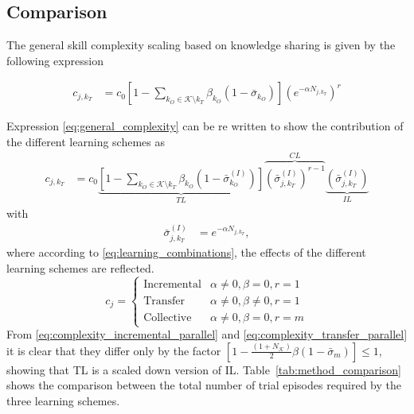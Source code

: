 \subsection{Comparison}
The general skill complexity scaling based on knowledge sharing is given by the following expression
\begin{tcolorbox}
	\begin{align}\label{eq:general_complexity}
		c_{j,k_T} &= c_0\left[1- \sum\limits_{k_O \in \mathcal{K} \setminus k_T}\beta_{k_O} \left( 1 - \bar{\sigma}_{k_O} \right)\right] \left(e^{-\alpha N_{j,k_T}} \right)^r
	\end{align}
\end{tcolorbox}
Expression \ref{eq:general_complexity} can be re written to show the contribution of the different learning schemes as
\begin{align}
	c_{j,k_T} &= c_0\underbrace{\left[1- \sum\limits_{k_O \in \mathcal{K} \setminus k_T}\beta_{k_O} \left( 1 - \bar{\sigma}^{(I)}_{k_O} \right)\right]}_{TL}\overbrace{ \left(\bar{\sigma}^{(I)}_{j,k_T} \right)^{r-1}}^{CL}\underbrace{ \left(\bar{\sigma}^{(I)}_{j,k_T} \right)}_{IL}
\end{align}
with
\begin{align}
    \bar{\sigma}^{(I)}_{j,k_T}&= e^{-\alpha N_{j,k_T}},
\end{align}
 where according to \eqref{eq:learning_combinations}, the effects of the different learning schemes are reflected.
 \begin{equation}
	 c_j =
	     \begin{cases} 
		       \text{Incremental} & \alpha\neq 0, \beta=0,  r=1 \\
		       \text{Transfer} & \alpha\neq 0, \beta \neq 0, r = 1 \\
		       \text{Collective} & \alpha\neq 0, \beta = 0, r=m 
		   \end{cases}
	   \label{eq:learning_combinations}
\end{equation}
From \eqref{eq:complexity_incremental_parallel} and \eqref{eq:complexity_transfer_parallel} it is clear that they differ only by the factor $ \left[1 - \frac{\left(1+N_\mathcal{K}\right)}{2}\beta \left(1-\bar{\sigma}_m\right)\right] \leq 1$, showing that TL is a scaled down version of IL. Table~\ref{tab:method_comparison} shows the comparison between the total number of trial episodes required by the three learning schemes.

